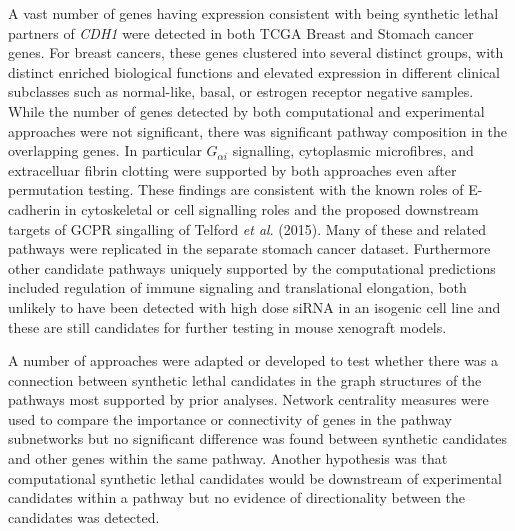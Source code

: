 A vast number of genes having expression consistent with being synthetic lethal partners of \textit{CDH1} were detected in both TCGA Breast and Stomach cancer genes. For breast cancers, these genes clustered into several distinct groups, with distinct enriched biological functions and elevated expression in different clinical subclasses such as normal-like, basal, or estrogen receptor negative samples. While the number of genes detected by both computational and experimental approaches were not significant, there was significant pathway composition in the overlapping genes. In particular $G_{\alpha i}$ signalling, cytoplasmic microfibres, and extracelluar fibrin clotting were supported by both approaches even after permutation testing. These findings are consistent with the known roles of E-cadherin in cytoskeletal or cell signalling roles and the proposed downstream targets of GCPR singalling of Telford \textit{et al}. (2015). Many of these and related pathways were replicated in the separate stomach cancer dataset. Furthermore other candidate pathways uniquely supported by the computational predictions included regulation of immune signaling and translational elongation, both unlikely to have been detected with high dose siRNA in an isogenic cell line and these are still candidates for further testing in mouse xenograft models. 

A number of approaches were adapted or developed to test whether there was a connection between synthetic lethal candidates in the graph structures of the pathways most supported by prior analyses. Network centrality measures were used to compare the importance or connectivity of genes in the pathway subnetworks but no significant difference was found between synthetic candidates and other genes within the same pathway. Another hypothesis was that computational synthetic lethal candidates would be downstream of experimental candidates within a pathway but no evidence of directionality between the candidates was detected. 


